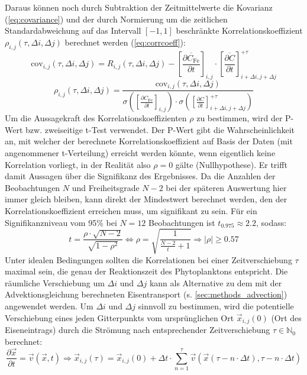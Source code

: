 \documentclass[12pt,a4paper,onecolumn]{scrartcl}
\begin{document}
Daraus können noch durch Subtraktion der Zeitmittelwerte die Kovarianz (\ref{eq:covariance}) und der durch Normierung um die zeitlichen Standardabweichung auf das Intervall $[-1,1]$ beschränkte Korrelationskoeffizient $\rho_{i,j}(\tau,\Delta i, \Delta j)$ berechnet werden (\ref{eq:corrcoeff}):
\begin{equation}
\text{cov}_{i,j}(\tau,\Delta i, \Delta j) = R_{i,j}(\tau,\Delta i, \Delta j)-\left[\frac{\overline{\partial C_\text{Fe}}}{\partial t}\right]_{i,j} \cdot \left[\frac{\overline{\partial C}}{\partial t}\right]_{i+\Delta i,j+\Delta j}^{+\tau} \label{eq:covariance}
\end{equation}
\begin{equation}
\rho_{i,j}(\tau,\Delta i, \Delta j) = \frac{\text{cov}_{i,j}(\tau,\Delta i, \Delta j)}{\sigma \left(\left[\frac{\partial C_\text{Fe}}{\partial t}\right]_{i,j}\right) \cdot \sigma\left(\left[\frac{\partial C}{\partial t}\right]_{i+\Delta i ,j+\Delta j}^{+\tau}\right)} \label{eq:corrcoeff}
\end{equation}
Um die Aussagekraft des Korrelationskoeffizienten $\rho$ zu bestimmen, wird der P-Wert bzw. zweiseitige t-Test verwendet. Der P-Wert gibt die Wahrscheinlichkeit an, mit welcher der berechnete Korrelationskoeffizient auf Basis der Daten (mit angenommener t-Verteilung) erreicht werden könnte, wenn eigentlich keine Korrelation vorliegt, in der Realität also $\rho=0$ gälte (Nullhypothese). Er trifft damit Aussagen über die Signifikanz des Ergebnisses. Da die Anzahlen der Beobachtungen $N$ und Freiheitsgrade $N-2$ bei der späteren Auswertung hier immer gleich bleiben, kann direkt der Mindestwert berechnet werden, den der Korrelationskoeffizient erreichen muss, um signifikant zu sein. Für ein Signifikanzniveau vom 95\% bei $N = 12$ Beobachtungen ist $t_{0.975}\approx 2.2$, sodass:
\begin{equation}
t = \frac{\rho \cdot \sqrt{N-2}}{\sqrt{1-\rho^2}} \Leftrightarrow \rho = \sqrt{\frac{1}{\frac{N-2}{t}+1}} \Rightarrow |\rho| \geq 0.57 
\end{equation}
Unter idealen Bedingungen sollten die Korrelationen bei einer Zeitverschiebung $\tau$ maximal sein, die genau der Reaktionszeit des Phytoplanktons entspricht. Die räumliche Verschiebung um $\Delta i$ und $\Delta j$ kann als Alternative zu dem mit der Advektionsgleichung berechneten Eisentransport (s. \ref{sec:methods_advection}) angewendet werden. Um $\Delta i$ und $\Delta j$ sinnvoll zu bestimmen, wird die potentielle Verschiebung eines jeden Gitterpunkts vom ursprünglichen Ort $\vec{x}_{i,j}(0)$ (Ort des Eiseneintrags) durch die Strömung nach entsprechender Zeitverschiebung $\tau \in \mathbb{N}_0$ berechnet:
\begin{equation}
\frac{\partial \vec{x}}{\partial t} = \vec{v}(\vec{x},t) \Rightarrow \vec{x}_{i,j}(\tau) =   \vec{x}_{i,j}(0) + \Delta t \cdot \sum\limits_{n = 1}^{\tau} \vec{v} \left( \vec{x}(\tau - n \cdot \Delta t),\tau - n \cdot \Delta t \right) \label{eq:position_shift}
\end{equation}
\end{document}
